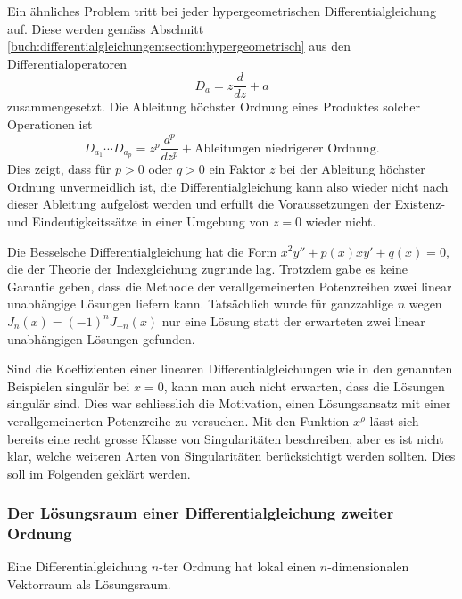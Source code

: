 Ein ähnliches Problem tritt bei jeder hypergeometrischen
Differentialgleichung auf.
Diese werden gemäss Abschnitt
\ref{buch:differentialgleichungen:section:hypergeometrisch}
aus den Differentialoperatoren
\[
D_a=z\frac{d}{dz} + a
\]
zusammengesetzt.
Die Ableitung höchster Ordnung eines Produktes solcher Operationen ist
\[
D_{a_1}
\cdots
D_{a_p}
=
z^p\frac{d^p}{dz^p} + \text{Ableitungen niedrigerer Ordnung}.
\]
Dies zeigt, dass für $p>0$ oder $q>0$ ein Faktor $z$ bei der
Ableitung höchster Ordnung unvermeidlich ist, die Differentialgleichung
kann also wieder nicht nach dieser Ableitung aufgelöst werden und
erfüllt die Voraussetzungen der Existenz- und Eindeutigkeitssätze
in einer Umgebung von $z=0$ wieder nicht.

Die Besselsche Differentialgleichung
hat die Form $x^2y''+p(x)xy'+q(x)=0$, die der Theorie der 
Indexgleichung zugrunde lag.
%
%
Trotzdem gabe es keine Garantie geben, dass die Methode der
verallgemeinerten Potenzreihen zwei linear unabhängige Lösungen
liefern kann.
Tatsächlich wurde für ganzzahlige $n$ wegen $J_n(x) = (-1)^n J_{-n}(x)$
nur eine Lösung statt der erwarteten zwei linear unabhängigen
Lösungen gefunden.

Sind die Koeffizienten einer linearen Differentialgleichungen wie
in den genannten Beispielen singulär bei $x=0$, kann man auch nicht
erwarten, dass die Lösungen singulär sind.
Dies war schliesslich die Motivation, einen Lösungsansatz mit einer
verallgemeinerten Potenzreihe zu versuchen.
Mit den Funktion $x^\varrho$ lässt sich bereits eine recht grosse
Klasse von Singularitäten beschreiben, aber es ist nicht klar,
welche weiteren Arten von Singularitäten berücksichtigt werden sollten.
Dies soll im Folgenden geklärt werden.

%
%
\subsubsection{Der Lösungsraum einer Differentialgleichung zweiter Ordnung}
Eine Differentialgleichung $n$-ter Ordnung hat lokal einen $n$-dimensionalen
Vektorraum als Lösungsraum.


